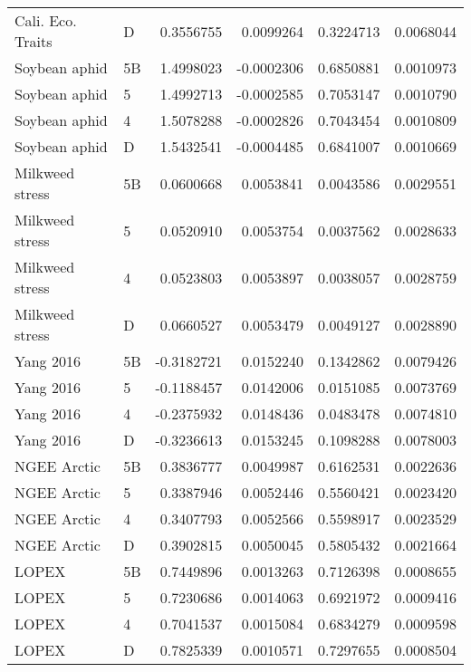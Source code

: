 \begin{tabular}{llrrrr}
Cali. Eco. Traits & D & 0.3556755 & 0.0099264 & 0.3224713 & 0.0068044\\
Soybean aphid & 5B & 1.4998023 & -0.0002306 & 0.6850881 & 0.0010973\\
\addlinespace
Soybean aphid & 5 & 1.4992713 & -0.0002585 & 0.7053147 & 0.0010790\\
Soybean aphid & 4 & 1.5078288 & -0.0002826 & 0.7043454 & 0.0010809\\
Soybean aphid & D & 1.5432541 & -0.0004485 & 0.6841007 & 0.0010669\\
Milkweed stress & 5B & 0.0600668 & 0.0053841 & 0.0043586 & 0.0029551\\
Milkweed stress & 5 & 0.0520910 & 0.0053754 & 0.0037562 & 0.0028633\\
\addlinespace
Milkweed stress & 4 & 0.0523803 & 0.0053897 & 0.0038057 & 0.0028759\\
Milkweed stress & D & 0.0660527 & 0.0053479 & 0.0049127 & 0.0028890\\
Yang 2016 & 5B & -0.3182721 & 0.0152240 & 0.1342862 & 0.0079426\\
Yang 2016 & 5 & -0.1188457 & 0.0142006 & 0.0151085 & 0.0073769\\
Yang 2016 & 4 & -0.2375932 & 0.0148436 & 0.0483478 & 0.0074810\\
\addlinespace
Yang 2016 & D & -0.3236613 & 0.0153245 & 0.1098288 & 0.0078003\\
NGEE Arctic & 5B & 0.3836777 & 0.0049987 & 0.6162531 & 0.0022636\\
NGEE Arctic & 5 & 0.3387946 & 0.0052446 & 0.5560421 & 0.0023420\\
NGEE Arctic & 4 & 0.3407793 & 0.0052566 & 0.5598917 & 0.0023529\\
NGEE Arctic & D & 0.3902815 & 0.0050045 & 0.5805432 & 0.0021664\\
\addlinespace
LOPEX & 5B & 0.7449896 & 0.0013263 & 0.7126398 & 0.0008655\\
LOPEX & 5 & 0.7230686 & 0.0014063 & 0.6921972 & 0.0009416\\
LOPEX & 4 & 0.7041537 & 0.0015084 & 0.6834279 & 0.0009598\\
LOPEX & D & 0.7825339 & 0.0010571 & 0.7297655 & 0.0008504\\
\bottomrule
\end{tabular}